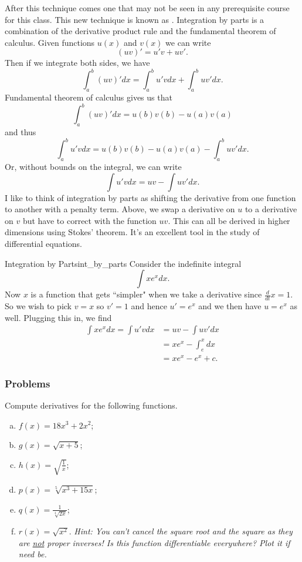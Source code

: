     After this technique comes one that may not be seen in any prerequisite course for this class.  This new technique is known as . Integration by parts is a combination of the derivative product rule and the fundamental theorem of calculus.  Given functions $u(x)$ and $v(x)$ we can write
    \[
    (uv)'=u'v+uv'.
    \]
    Then if we integrate both sides, we have
    \[
    \int_a^b (uv)'dx = \int_a^b u'vdx + \int_a^b uv'dx.
    \]
    Fundamental theorem of calculus gives us that
    \[
    \int_a^b (uv)'dx = u(b)v(b)-u(a)v(a)
    \]
    and thus
    \[
    \int_a^b u'vdx = u(b)v(b)-u(a)v(a)-\int_a^b uv'dx.
    \]
    Or, without bounds on the integral, we can write
    \[
    \int u'vdx = uv - \int uv'dx.
    \]
    I like to think of integration by parts as shifting the derivative from one function to another with a penalty term.  Above, we swap a derivative on $u$ to a derivative on $v$ but have to correct with the function $uv$.  This can all be derived in higher dimensions using Stokes' theorem. It's an excellent tool in the study of differential equations.
    
    \begin{ex}{Integration by Parts}{int_by_parts}
        Consider the indefinite integral
        \[
        \int xe^x dx.
        \]
        Now $x$ is a function that gets ``simpler" when we take a derivative since $\frac{d}{dt}x= 1$.  So we wish to pick $v=x$ so $v'=1$ and hence $u'=e^x$ and we then have $u=e^x$ as well.  Plugging this in, we find
        \begin{align*}
            \int xe^x dx = \int u'vdx &= uv - \int uv'dx\\
            &= xe^x-\int_e^xdx\\
            &= xe^x - e^x + c.
        \end{align*}
    \end{ex}
    
    \subsubsection{Problems}
    
    \begin{problem}
    Compute derivatives for the following functions.
    \begin{enumerate}[(a)]
        \item $f(x)=18x^3+2x^2$;
        \item $g(x)=\sqrt{x+5}$;
        \item $h(x)=\sqrt{\frac{1}{x}}$;
        \item $p(x)=\sqrt[5]{x^3+15x}$;
        \item $q(x)=\frac{1}{\sqrt[4]{2x}}$;
        \item $r(x)=\sqrt{x^2}$. \emph{Hint: You can't cancel the square root and the square as they are \underline{not} proper inverses! Is this function differentiable everywhere? Plot it if need be.}
    \end{enumerate}
    \end{problem}
    
